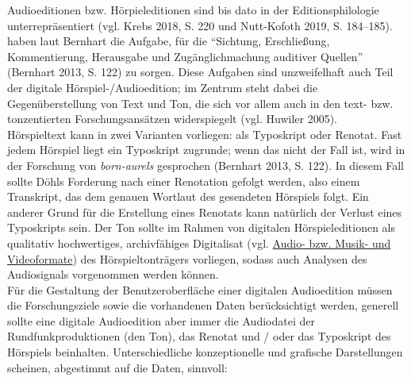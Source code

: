 \documentclass{article}
\begin{document}
    Audioeditionen bzw. Hörpieleditionen sind bis dato in der Editionsphilologie
                  unterrepräsentiert (vgl. Krebs 2018, S. 220 und Nutt-Kofoth 2019, S.
                     184–185). haben laut Bernhart die Aufgabe, für die “Sichtung,
                  Erschließung, Kommentierung, Herausgabe und Zugänglichmachung auditiver Quellen”
                     (Bernhart 2013, S. 122) zu sorgen. Diese Aufgaben sind
                  unzweifelhaft auch Teil der digitale Hörspiel-/Audioedition; im Zentrum steht
                  dabei die Gegenüberstellung von Text und Ton, die sich vor allem auch in den text-
                  bzw. tonzentierten Forschungsansätzen widerspiegelt (vgl. Huwiler
                     2005). \\
            
        Hörspieltext kann in zwei Varianten vorliegen: als Typoskript oder Renotat. Fast
                  jedem Hörspiel liegt ein Typoskript zugrunde; wenn das nicht der Fall ist, wird in
                  der Forschung von \emph{born-aurels} gesprochen (Bernhart
                     2013, S. 122). In diesem Fall sollte Döhls Forderung nach einer
                  Renotation gefolgt werden, also einem Transkript, das dem genauen Wortlaut des
                  gesendeten Hörspiels folgt. Ein anderer Grund für die Erstellung eines Renotats
                  kann natürlich der Verlust eines Typoskripts sein. Der Ton sollte im Rahmen von
                  digitalen Hörspieleditionen als qualitativ hochwertiges, archivfähiges Digitalisat
                  (vgl. \href{http://gams.uni-graz.at/o:konde.121}{Audio- bzw. Musik- und
                     Videoformate}) des Hörspieltonträgers vorliegen, sodass auch Analysen des
                  Audiosignals vorgenommen werden können.\\
            
        Für die Gestaltung der Benutzeroberfläche einer digitalen Audioedition müssen die
                  Forschungsziele sowie die vorhandenen Daten berücksichtigt werden, generell sollte
                  eine digitale Audioedition aber immer die Audiodatei der Rundfunkproduktionen (den
                  Ton), das Renotat und / oder das Typoskript des Hörspiels beinhalten.
                  Unterschiedliche konzeptionelle und grafische Darstellungen scheinen, abgestimmt
                  auf die Daten, sinnvoll:\\
            
\end{document}
